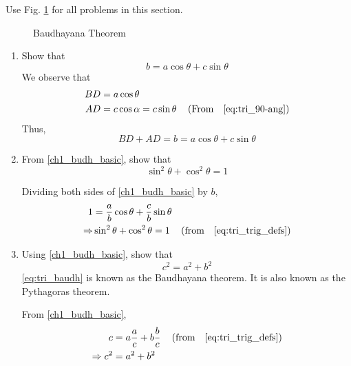 Use Fig. \ref{fig:tri_baudh} for all problems in this section.
\begin{figure}[!ht]
	\begin{center}
		\resizebox{\columnwidth}{!}{}
	\end{center}
	\caption{Baudhayana Theorem}
	\label{fig:tri_baudh}	
\end{figure}
\renewcommand{\theequation}{\theenumi}
\begin{enumerate}[label=\thesection.\arabic*.,ref=\thesection.\theenumi]

%
\item
Show that 
%
\begin{equation}
\label{ch1_budh_basic}
b = a \cos \theta + c \sin \theta
\end{equation}
%
\solution We observe that
%
\begin{align}
BD &= a \cos \theta \\
AD &= c \cos\alpha = c \sin \theta \quad \left(\text{From} \quad \eqref{eq:tri_90-ang}
\right)
\end{align}
%
Thus,
\begin{equation}
BD + AD = b = a \cos \theta + c \sin \theta
\end{equation}
\item
From \eqref{ch1_budh_basic}, show that
%
\begin{equation}
%
\label{eq:tri_sin_cos_id}
\sin ^2 \theta + \cos ^2 \theta = 1
\end{equation}


%
\solution Dividing both sides of \eqref{ch1_budh_basic} by $b$, 
\begin{align}
1 &= \frac{a}{b}\cos\theta + \frac{c}{b}\sin\theta\\
\Rightarrow &\sin ^2 \theta + \cos ^2 \theta = 1 \quad \left(\text{from} \quad \eqref{eq:tri_trig_defs}\right)
\end{align}

\item
	Using \eqref{ch1_budh_basic}, show that
	\begin{equation}
	\label{eq:tri_baudh}
	c^2 = a^2 + b^2
	\end{equation}
	\eqref{eq:tri_baudh} is known as the Baudhayana theorem.  It is also known as the Pythagoras theorem.

\solution From \eqref{ch1_budh_basic},
\begin{align}
c &= a\frac{a}{c} + b \frac{b}{c} \quad \left(\text{from} \quad \eqref{eq:tri_trig_defs}\right)\\
\Rightarrow c^2 &= a^2 + b^2
\end{align}
\end{enumerate}
%
\iffalse
